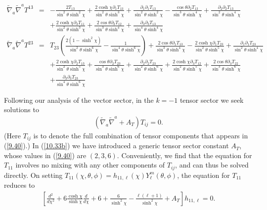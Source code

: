\documentclass[aps,onecolumn,10pt]{revtex4}
\numberwithin{equation}{section}
\numberwithin{equation}{section}
\begin{document}
\begin{eqnarray}
 \nonumber\\ 
\tilde{\nabla}_a\tilde{\nabla}^aT^{13}&=& - \frac{2 T_{13}}{\sin^2\theta \sinh^2\chi} + \frac{2 \cosh\chi \partial_{1}T_{13}}{\sin^2\theta \sinh^3\chi} + \frac{\partial_{1}\partial_{1}T_{13}}{\sin^2\theta \sinh^2\chi} -  \frac{\cos\theta \partial_{2}T_{13}}{\sin^3\theta \sinh^4\chi} + \frac{\partial_{2}\partial_{2}T_{13}}{\sin^2\theta \sinh^4\chi} \nonumber \\ 
&& + \frac{2 \cosh\chi \partial_{3}T_{11}}{\sin^2\theta \sinh^3\chi} + \frac{2 \cos\theta \partial_{3}T_{12}}{\sin^3\theta \sinh^4\chi} + \frac{\partial_{3}\partial_{3}T_{13}}{\sin^4\theta \sinh^4\chi}
 \nonumber\\ 
\tilde{\nabla}_a\tilde{\nabla}^aT^{23}&=& T_{23} \left(\frac{2(1-\sinh^2\chi)}{\sin^2\theta\sinh^6\chi} -  \frac{1}{\sin^4\theta \sinh^6\chi}\right) + \frac{2 \cos\theta \partial_{1}T_{13}}{\sin^3\theta \sinh^4\chi} -  \frac{2 \cosh\chi \partial_{1}T_{23}}{\sin^2\theta \sinh^5\chi} + \frac{\partial_{1}\partial_{1}T_{23}}{\sin^2\theta \sinh^4\chi} \nonumber \\ 
&& + \frac{2 \cosh\chi \partial_{2}T_{13}}{\sin^2\theta \sinh^5\chi} + \frac{\cos\theta \partial_{2}T_{23}}{\sin^3\theta \sinh^6\chi} + \frac{\partial_{2}\partial_{2}T_{23}}{\sin^2\theta \sinh^6\chi} + \frac{2 \cosh\chi \partial_{3}T_{12}}{\sin^2\theta \sinh^5\chi} + \frac{2 \cos\theta \partial_{3}T_{22}}{\sin^3\theta \sinh^6\chi} \nonumber \\ 
&& + \frac{\partial_{3}\partial_{3}T_{23}}{\sin^4\theta \sinh^6\chi}
\label{10.32b}
\end{eqnarray}
%

Following our analysis of the vector sector, in the $k=-1$ tensor sector we seek solutions to
%
\begin{eqnarray}
(\tilde{\nabla}_a\tilde{\nabla}^a+A_T)T_{ij}=0.
\label{10.33b}
\end{eqnarray}
%
(Here $T_{ij}$ is to denote the full combination of  tensor components that appears in (\ref{9.40}).)  In (\ref{10.33b}) we have introduced a generic tensor sector constant $A_T$, whose values in (\ref{9.40})  are $(2,3,6)$.
Conveniently, we find that the equation for $T_{11}$ involves no mixing with any other components of $T_{ij}$, and can thus be solved directly. On setting $T_{11}(\chi,\theta,\phi)=h_{11,\ell}(\chi)Y_{\ell}^m(\theta,\phi)$, the equation for $T_{11}$ reduces to 
%
\begin{eqnarray}
\left[\frac{d^2}{d\chi^2}+6\frac{\cosh\chi}{ \sinh\chi}\frac{d }{d\chi}
+6+\frac{6 }{ \sinh^2\chi}-\frac{\ell(\ell+1)}{ \sinh^2\chi}+A_T\right]h_{11,\ell}=0.
\label{10.34b}
\end{eqnarray}
%
\end{document}
